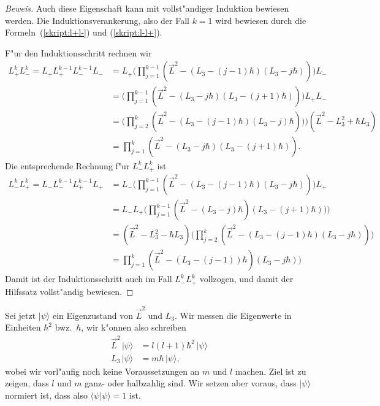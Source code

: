 \begin{proof}[Beweis]
Auch diese Eigenschaft kann mit vollst"andiger Induktion bewiesen
werden.
Die Induktionsverankerung, also der Fall $k=1$ wird bewiesen durch
die Formeln~(\ref{skript:l+l-}) und (\ref{skript:l-l+}).

F"ur den Induktionsschritt rechnen wir
\begin{align*}
L_+^kL_-^k
=
L_+ L_+^{k-1}L_-^{k-1}L_-
&=
L_+\biggl(
\prod_{j=1}^{k-1} (\vec L^2 - (L_3-(j-1)\hbar)(L_3-j\hbar))
\biggr)L_-
\\
&=
\biggl(
\prod_{j=1}^{k-1} (\vec L^2 - (L_3-j\hbar)(L_3-(j+1)\hbar))
\biggr)L_+L_-
\\
&=
\biggl(
\prod_{j=2}^{k} (\vec L^2 - (L_3-(j-1)\hbar)(L_3-j)\hbar))
\biggr)
(\vec L^2 -L_3^2+\hbar L_3)
\\
&=
\prod_{j=1}^{k} (\vec L^2 - (L_3-j\hbar)(L_3-(j+1)\hbar)).
\end{align*}
Die entsprechende Rechnung f"ur $L_-^kL_+^k$ ist
\begin{align*}
L_-^kL_+^k
=
L_-L_-^{k-1}L_+^{k-1}L_+
&=
L_-\biggl(
\prod_{j=1}^{k-1}
(\vec L^2-(L_3-(j-1)\hbar)(L_3-j\hbar))
\biggr)L_+
\\
&=
L_-L_+\biggl(
\prod_{j=1}^{k-1}
(\vec L^2-(L_3-j)\hbar)(L_3-(j+1)\hbar))
\biggr)
\\
&=
(\vec L^2-L_3^2-\hbar L_3)\biggl(
\prod_{j=2}^k
(\vec L^2-(L_3-(j-1)\hbar)(L_3-j\hbar))
\biggr)
\\
&=
\prod_{j=1}^k
(\vec L^2-(L_3-(j-1))\hbar)(L_3-j\hbar))
\end{align*}
Damit ist der Induktionsschritt auch im Fall $L_-^kL_+^k$ vollzogen, und
damit der Hilfssatz vollst"andig bewiesen.
\end{proof}

Sei jetzt $|\psi\rangle$ ein Eigenzustand von $\vec L^2$ und $L_3$.
Wir messen die Eigenwerte in Einheiten $\hbar^2$ bwz.~$\hbar$, wir
k"onnen also schreiben
\begin{align*}
\vec L^2\, |\psi\rangle &= l(l+1)\hbar^2\,|\psi\rangle \\
     L_3\, |\psi\rangle &= m\hbar\,       |\psi\rangle,
\end{align*}
wobei wir vorl"aufig noch keine Voraussetzungen an $m$ und $l$ machen.
Ziel ist zu zeigen, dass $l$ und $m$ ganz- oder halbzahlig sind.
Wir setzen aber voraus, dass $|\psi\rangle$ normiert ist, dass also
$\langle\psi|\psi\rangle=1$ ist.

